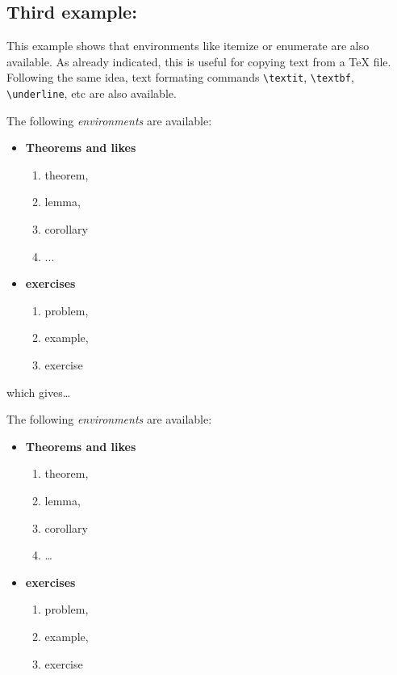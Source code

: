     \subsection{Third example:}\label{third-example}

    This example shows that environments like itemize or enumerate are also
available. As already indicated, this is useful for copying text from a
TeX file. Following the same idea, text formating commands
\texttt{\textbackslash{}textit}, \texttt{\textbackslash{}textbf},
\texttt{\textbackslash{}underline}, etc are also available.

    \begin{listing}
The following \textit{environments} are available:
\begin{itemize}
    \item \textbf{Theorems and likes}
    \begin{enumerate}
        \item theorem,
        \item lemma,
        \item corollary
        \item ...
    \end{enumerate}
    \item \textbf{exercises}
    \begin{enumerate}
        \item problem,
        \item example,
        \item exercise
    \end{enumerate}
\end{itemize}
\end{listing}

    which gives\ldots{}

The following \textit{environments} are available:

\begin{itemize}
\item \textbf{Theorems and likes}

\begin{enumerate}
\item theorem, \item lemma, \item corollary \item \ldots{}
\end{enumerate}

\item \textbf{exercises}

\begin{enumerate}
\item problem, \item example, \item exercise
\end{enumerate}
\end{itemize}

